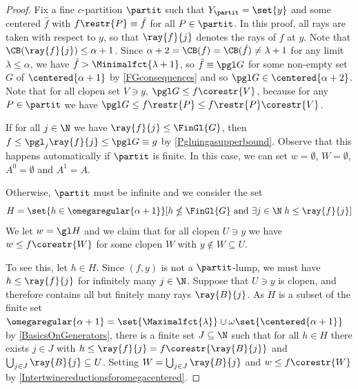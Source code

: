 \begin{proof}
Fix a fine $c$-partition $\partit$ such that $Y_\partit=\set{y}$ and some centered $\hat{f}$ with $f\restr{P}\equiv \hat{f}$ for all $P\in \partit$.
In this proof, all rays are taken with respect to $y$, so that $\ray{f}{j}$ denotes the rays of $f$ at $y$. Note that $\CB(\ray{f}{j})\leq\alpha+1$.
Since $\alpha+2=\CB(f)=\CB(\hat{f})\neq\lambda+1$ for any limit $\lambda\leq\alpha$, we have $\hat{f}>\Minimalfct{\lambda+1}$,
so $\hat{f}\equiv \pgl G$ for some non-empty set $G$ of $\centered{\alpha+1}$ by \cref{FGconsequences} and so $\pgl G\in\centered{\alpha+2}$. 
Note that for all clopen set $V\ni y$, $\pgl G \leq f\corestr{V}$, because for any $P\in \partit$ we have $\pgl G\leq f\restr{P} \leq f\restr{P}\corestr{V}$.

If for all $j\in\N$ we have $\ray{f}{j}\leq\FinGl{G}$, then $f\leq\pgl_j\ray{f}{j}\leq \pgl G\equiv g$ by \cref{Pgluingasupperbound}.
Observe that this happens automatically if $\partit$ is finite.
In this case, we can set $w=\emptyset$, $W=\emptyset$, $A^0=\emptyset$ and $A^1=A$. 

\smallskip

Otherwise, $\partit$ must be infinite and we consider the set 
\[
H=\set{h\in \omegaregular{\alpha+1}}[h\nleq\FinGl{G} \text{ and } \exists j\in\N \; h \leq \ray{f}{j}]
\]
We let $w=\gl H$ and we claim that for all clopen $U\ni y$ we have $w\leq f\corestr{W}$ for some clopen $W$ with $y\notin W\subseteq U$.

To see this, let $h\in H$. Since $(f,y)$ is not a $\partit$-lump, we must have $h\leq\ray{f}{j}$ for infinitely many $j\in\N$.
Suppose that $U\ni y$ is clopen, and therefore contains all but finitely many rays $\ray{B}{j}$.
As $H$ is a subset of the finite set $\omegaregular{\alpha+1}=\set{\Maximalfct{\lambda}}\cup\omega \set{\centered{\alpha+1}}$ by \cref{BasicsOnGenerators}, there is a finite set $J\subseteq\N$ such that for all $h\in H$ there exists $j\in J$ with
$h\leq \ray{f}{j}=f\corestr{\ray{B}{j}}$ and $\bigcup_{j\in J}\ray{B}{j}\subseteq U$.
Setting $W=\bigcup_{j\in J}\ray{B}{j}$ and $w\leq f\corestr{W}$ by \cref{Intertwinereductionsforomegacentered}.%


\end{proof}
